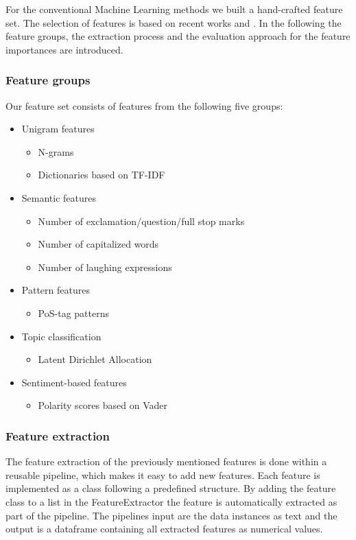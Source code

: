 For the conventional Machine Learning methods we built a hand-crafted feature set. The selection of features is based on recent works \cite{Watanabe2018} and \cite{Fortuna2018}. In the following the feature groups, the extraction process and the evaluation approach for the feature importances are introduced.

\subsubsection*{Feature groups}

Our feature set consists of features from the following five groups:
\begin{itemize}
	\item Unigram features \cite{ThomasDavidson2020, Fortuna2018, Gaydhani2018, Malmasi2017, Oriola2020}
	\begin{itemize}
		\item N-grams
		\item Dictionaries based on TF-IDF
	\end{itemize}
	\item Semantic features \cite{ThomasDavidson2020, Watanabe2018}
	\begin{itemize}
		\item Number of exclamation/question/full stop marks
		\item Number of capitalized words
		\item Number of laughing expressions
	\end{itemize}
	\item Pattern features \cite{Fortuna2018, Oriola2020}
	\begin{itemize}
		\item PoS-tag patterns
	\end{itemize}
	\item Topic classification \cite{Fortuna2018}
	\begin{itemize}
		\item Latent Dirichlet Allocation
	\end{itemize}
	\item Sentiment-based features \cite{Fortuna2018, Oriola2020}
	\begin{itemize}
		\item Polarity scores based on Vader
	\end{itemize}
\end{itemize}

\subsubsection*{Feature extraction}
The feature extraction of the previously mentioned features is done within a reusable pipeline, which makes it easy to add new features. Each feature is implemented as a class following a predefined structure. By adding the feature class to a list in the Feature\-Extractor the feature is automatically extracted as part of the pipeline. The pipelines input are the data instances as text and the output is a dataframe containing all extracted features as numerical values.


